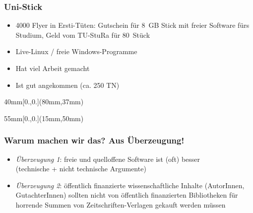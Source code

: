 \documentclass{beamer}
\begin{document}
\begin{frame}[label=ct1b,t]
  \frametitle{Uni-Stick}

  \begin{itemize}
  \item 4000 Flyer in Ersti-Tüten: Gutschein für 8~GB Stick mit freier Software
    fürs Studium, Geld vom TU-StuRa für 80~Stück
  \item Live-Linux / freie Windows-Programme
    \pause
  \item Hat viel Arbeit gemacht
    \pause
  \item Ist gut angekommen (ca. 250 TN)
  \end{itemize}

  \begin{textblock*}{40mm}[0.,0.](80mm,37mm)
  \end{textblock*}

  \begin{textblock*}{55mm}[0.,0.](15mm,50mm)
  \end{textblock*}

\end{frame}

\begin{frame}[label=ct2]
  \frametitle{Warum machen wir das? Aus Überzeugung!}

  \onslide<+->

  \begin{itemize}
  \item \emph{Überzeugung 1}: freie und quelloffene Software ist (oft) besser\\
    (technische + nicht technische Argumente)\\
    \bigskip\onslide<+->
  \item \emph{Überzeugung 2}: öffentlich finanzierte wissenschaftliche Inhalte
    (AutorInnen, GutachterInnen) sollten nicht von öffentlich finanzierten
    Bibliotheken für horrende Summen von Zeitschriften-Verlagen gekauft werden
    müssen
  \end{itemize}
\end{frame}
\end{document}

